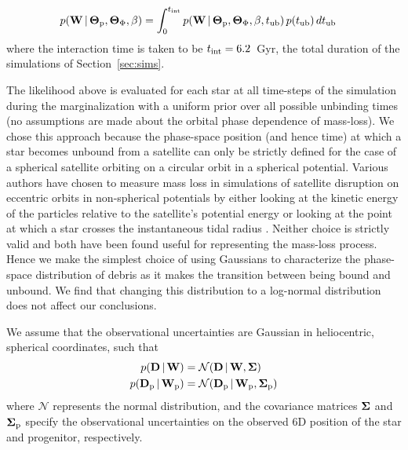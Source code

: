 \documentclass{emulateapj}
\newcommand{\given}{\,|\,}
\newcommand{\D}{{\bf D}}
\newcommand{\W}{{\bf W}}
\newcommand{\bSigma}{{\bf \Sigma}}
\newcommand{\bs}{\boldsymbol}
\newcommand{\sat}{{\rm p}}
\newcommand{\tub}{t_{\rm ub}}
\newcommand{\tailbit}{\beta}
\begin{document}
\begin{align}
	p(\W \given \bs{\Theta}_\sat, \bs{\Theta}_\Phi, \tailbit) &= \int^{t_{\rm int}}_0 p(\W \given \bs{\Theta}_\sat, \bs{\Theta}_\Phi, \tailbit, \tub)\,p(\tub)\,d\tub
\end{align}
where the interaction time is taken to be $t_{\rm int}=6.2$~Gyr, the total duration of the simulations of Section~\ref{sec:sims}.

The likelihood above is evaluated for each star at all time-steps of the simulation during the marginalization with a uniform prior over all possible unbinding times (no assumptions are made about the orbital phase dependence of mass-loss). We chose this approach because the phase-space position (and hence time) at which a star becomes unbound from a satellite can only be strictly defined for the case of a spherical satellite orbiting on a circular orbit in a spherical potential. Various authors have chosen to measure mass loss in simulations of satellite disruption on eccentric orbits in non-spherical potentials by either looking at the kinetic energy of the particles relative to the satellite's potential energy \citep{johnston96 TODO} or looking at the point at which a star crosses the instantaneous tidal radius \citep{kuepper12}. Neither choice is strictly valid and both have been found useful for representing the mass-loss process. Hence we make the simplest choice of using Gaussians to characterize the phase-space distribution of debris as it makes the transition between being bound and unbound. We find that changing this distribution to a log-normal distribution does not affect our conclusions. 

We assume that the observational uncertainties are Gaussian in heliocentric, spherical coordinates, such that
\begin{align}
	p(\D \given \W) &= \mathcal{N}(\D \given \W, \bSigma)\label{eq:obsstar}\\
	p(\D_\sat \given \W_\sat) &= \mathcal{N}(\D_\sat \given \W_\sat, \bSigma_\sat)\label{eq:obsprog}
\end{align}
where $\mathcal{N}$ represents the normal distribution, and the covariance matrices $\bSigma$ and $\bSigma_\sat$ specify the observational uncertainties on the observed 6D position of the star and progenitor, respectively. 
\end{document}
